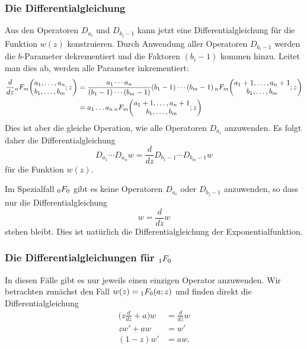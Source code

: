 \subsubsection{Die Differentialgleichung}
Aus den Operatoren $D_{a_i}$ und $D_{b_j-1}$ kann jetzt eine
Differentialgleichung für die Funktion $w(z)$ konstruieren.
Durch Anwendung aller Operatoren $D_{b_i-1}$ werden die
$b$-Parameter dekrementiert und die Faktoren $(b_i-1)$ kommen hinzu.
Leitet man dies ab, werden alle Parameter inkrementiert:
\begin{align*}
\frac{d}{dz}
\mathstrut_nF_m\biggl(
\begin{matrix}a_1,\dots,a_n\\
b_1,\dots,b_m\end{matrix};z
\biggr)
&=
\frac{a_1\cdots a_n}{(b_1-1)\cdots(b_m-1)}
(b_1-1)\cdots(b_m-1)
\,\mathstrut_nF_m\biggl(
\begin{matrix}a_1+1,\dots,a_n+1\\
b_1,\dots,b_m\end{matrix};z
\biggr)
\\
&=
a_1\dots a_n
\,\mathstrut_nF_m\biggl(
\begin{matrix}a_1+1,\dots,a_n+1\\
b_1,\dots,b_m\end{matrix};z
\biggr)
\end{align*}
Dies ist aber die gleiche Operation, wie alle Operatoren $D_{a_i}$ 
anzuwenden.
Es folgt daher die Differentialgleichung 
\[
D_{a_1}\cdots D_{a_n} w = \frac{d}{dz} D_{b_1-1}\cdots D_{b_m-1} w
\]
für die Funktion $w(z)$.

\begin{beispiel}
Im Spezialfall $\mathstrut_0F_0$ gibt es keine Operatoren $D_{a_i}$
oder $D_{b_j-1}$ anzuwenden, so dass nur die Differentialgleichung
\[
w=\frac{d}{dz}w
\]
stehen bleibt.
Dies ist natürlich die Differentialgleichung der Exponentialfunktion.
%
%
\end{beispiel}

%
%
\subsubsection{Die Differentialgleichungen für $\mathstrut_1F_0$}
In diesen Fälle gibt es nur jeweils einen einzigen Operator
anzuwenden.
Wir betrachten zunächst den Fall $w(z) = \mathstrut_1F_0(a; z)$
und finden direkt die Differentialgleichung
\begin{align*}
\biggl(z\frac{d}{dz}+a\biggr)w
&=
\frac{d}{dz}w
\\
zw'+a w
&=
w'
\\
(1-z)w'
&=
a w.
\end{align*}

